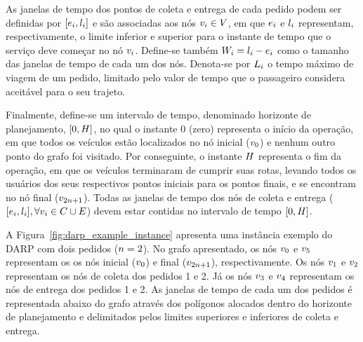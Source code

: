 As janelas de tempo dos pontos de coleta e entrega de cada pedido podem ser
definidas por $[e_{i},l_{i}]$ e são 
associadas aos nós $v_{i} \in V$, em que $e_{i}$ e 
$l_{i}$ representam, respectivamente, o limite inferior e 
superior para o instante de tempo que o serviço deve começar no nó $v_{i}$.
Define-se também $W_{i} = l_{i} 
- e_{i}$ como o tamanho das janelas de tempo 
de cada um dos nós. Denota-se por $L_i$ o tempo máximo de 
viagem de um pedido, limitado pelo valor de tempo que o passageiro considera 
aceitável para o seu trajeto. 

Finalmente, define-se um intervalo de tempo, denominado horizonte de
planejamento, $[0, H]$, no qual o instante $0$ (zero) representa
o início da operação, em que todos os veículos estão localizados no nó inicial 
($v_{0}$) e nenhum outro ponto do grafo foi visitado.
Por conseguinte, o instante $H$ representa o fim da operação, 
em que os veículos terminaram de cumprir suas rotas, levando todos os usuários 
dos seus respectivos pontos iniciais para os pontos finais, e se 
encontram no nó final ($v_{2n + 1}$). Todas as janelas de tempo dos nós de
coleta e entrega ($[e_i, l_i], 
\forall v_{i} \in C \cup E$) devem estar contidas 
no intervalo de tempo $[0, H]$.

A Figura~\ref{fig:darp_example_instance} apresenta uma instância exemplo
do DARP com dois pedidos ($n = 2$). 
No grafo apresentado, os nós $v_{0}$ e $v_{5}$ representam os os nós 
inicial ($v_{0}$) e final ($v_{2n + 1}$), respectivamente.
Os nós $v_{1}$ e $v_{2}$ representam os nós de coleta dos pedidos 1 e 2.
Já os nós $v_{3}$ e $v_{4}$ representam os nós de entrega dos pedidos 1 e
2.
As janelas de tempo de cada um dos pedidos é representada abaixo do grafo
através dos polígonos alocados dentro do horizonte de planejamento e
delimitados pelos limites superiores e inferiores de coleta e entrega.

